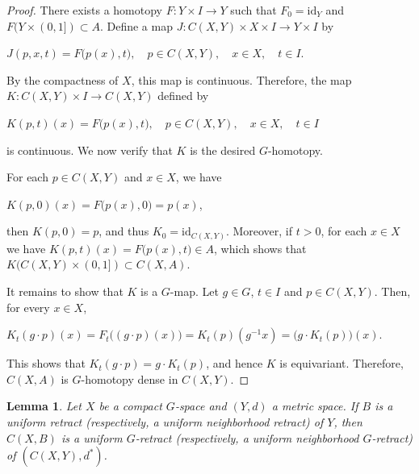 \documentclass[12pt]{amsart}
\newtheorem{lemma}[theorem]{Lemma}
\theoremstyle{definition}
\begin{document}
	\begin{proof}
		There exists a  homotopy $F:Y\times I\rightarrow Y$ such that $F_0=\text{id}_Y$ and $F(Y\times (0,1])\subset A$. Define a map $J:C(X,Y)\times X\times I \rightarrow Y\times I$ by
		
		\begin{center}
			$J(p,x,t)=F\big(p(x),t\big),\quad p\in C(X,Y),\quad x\in X,\quad t\in I$.
		\end{center}
		
		By the compactness of $X$, this map is continuous. Therefore, the map $K:C(X,Y)\times I\rightarrow C(X,Y)$ defined by
		
		\begin{center}
			$K(p,t)(x)=F\big(p(x),t\big),\quad p\in C(X,Y),\quad x\in X,\quad t\in I$
		\end{center}
		is continuous. We now verify that $K$ is the desired $G$-homotopy.
		
		For each $p\in C(X,Y)$ and $x\in X$, we have
		\begin{center}
			$K(p,0)(x)=F\big(p(x),0\big)=p(x)$,
		\end{center}
		then $K(p,0)=p$, and thus $K_0=\text{id}_{C(X,Y)}$. Moreover, if $t>0$, for each $x\in X$ we have $K(p,t)(x)=F\big(p(x),t\big)\in A$, which shows that $K(C(X,Y)\times (0,1])\subset C(X,A)$.
		
		It remains to show that $K$ is a $G$-map. Let $g\in G$, $t\in I$ and $p\in C(X,Y)$. Then, for every $x\in X$,
		
		\begin{center}
			$K_t(g\cdot p)(x)=F_t\big((g\cdot p)(x)\big)=K_t(p)(g^{-1} x)=\big(g\cdot K_t(p)\big)(x)$.
		\end{center}
		This shows that $K_t(g\cdot p)=g\cdot K_t(p)$, and hence $K$ is equivariant. Therefore, $C(X,A)$ is $G$-homotopy dense in $C(X,Y)$.
	\end{proof}
	
	\begin{lemma}\label{ejemplouniformretract}
		\rm{Let $X$ be a compact $G$-space and $(Y,d)$ a metric space. If $B$ is a uniform retract (respectively, a uniform neighborhood retract) of $Y$, then $C(X,B)$ is a uniform $G$-retract (respectively, a uniform neighborhood $G$-retract) of $(C(X,Y),d^*)$.}
	\end{lemma}
	
\end{document}
